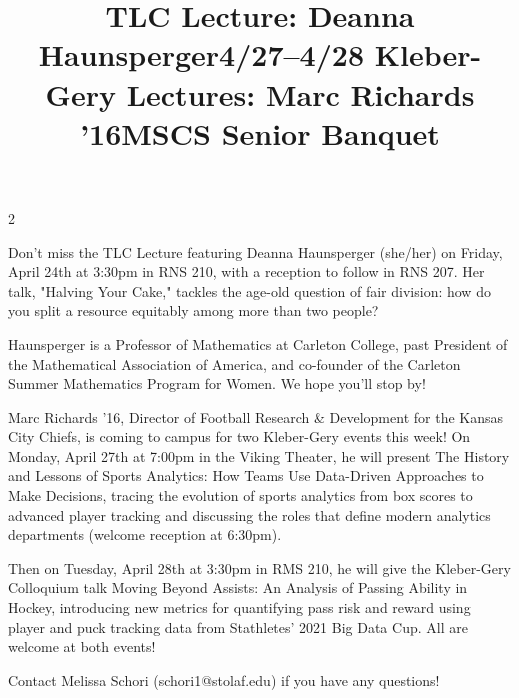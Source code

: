 \documentclass[12pt]{article}
\newcommand{\bolder}{\textbf}
\begin{document}
\begin{multicols}{2}
\begin{tcolorbox}[colback=white, colframe=black]
    \begin{center}
    \title{{\large \bolder{TLC Lecture: Deanna Haunsperger}}}
    \end{center}
\end{tcolorbox}

Don't miss the TLC Lecture featuring Deanna Haunsperger (she/her) on Friday, April 24th at 3:30pm in RNS 210, with a reception to follow in RNS 207. Her talk, "Halving Your Cake," tackles the age-old question of fair division: how do you split a resource equitably among more than two people? 

Haunsperger is a Professor of Mathematics at Carleton College, past President of the Mathematical Association of America, and co-founder of the Carleton Summer Mathematics Program for Women. We hope you'll stop by!

\begin{tcolorbox}[colback=white, colframe=black]
    \begin{center}
    \title{{\large \bolder{4/27--4/28 Kleber-Gery Lectures: Marc Richards '16}}}
    \end{center}
\end{tcolorbox}

Marc Richards '16, Director of Football Research \& Development for the Kansas City Chiefs, is coming to campus for two Kleber-Gery events this week! On Monday, April 27th at 7:00pm in the Viking Theater, he will present The History and Lessons of Sports Analytics: How Teams Use Data-Driven Approaches to Make Decisions, tracing the evolution of sports analytics from box scores to advanced player tracking and discussing the roles that define modern analytics departments (welcome reception at 6:30pm). 

Then on Tuesday, April 28th at 3:30pm in RMS 210, he will give the Kleber-Gery Colloquium talk Moving Beyond Assists: An Analysis of Passing Ability in Hockey, introducing new metrics for quantifying pass risk and reward using player and puck tracking data from Stathletes' 2021 Big Data Cup. All are welcome at both events!

Contact Melissa Schori (schori1@stolaf.edu) if you have any questions!

\begin{tcolorbox}[colback=white, colframe=black]
    \begin{center}
    \title{{\large \bolder{MSCS Senior Banquet}}}
    \end{center}
\end{tcolorbox}


\end{multicols}
\end{document}
